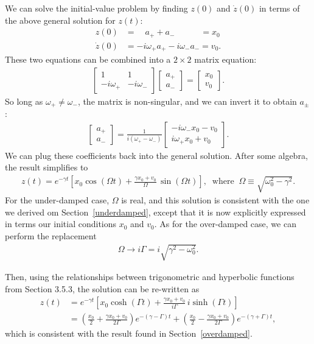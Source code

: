 \documentclass[10pt,a4paper]{article}
\begin{document}
We can solve the initial-value problem by finding $z(0)$ and
$\dot{z}(0)$ in terms of the above general solution for $z(t)$:
\begin{align}
  z(0) &= \quad a_+ + a_- \qquad\quad= x_0 \\
  \dot{z}(0) &= -i\omega_+ a_+ - i \omega_- a_- = v_0.
\end{align}
These two equations can be combined into a $2\times2$ matrix equation:
\begin{align}
  \begin{bmatrix}1 & 1 \\ -i\omega_+ & -i\omega_-\end{bmatrix} \begin{bmatrix}a_+ \\ a_-\end{bmatrix} = \begin{bmatrix}x_0 \\ v_0\end{bmatrix}.
\end{align}
So long as $\omega_+ \ne \omega_-$, the matrix is non-singular, and we
can invert it to obtain $a_\pm$:
\begin{align}
  \begin{bmatrix}a_+ \\ a_-\end{bmatrix} = \frac{1}{i(\omega_+-\omega_-)}\begin{bmatrix}-i\omega_-x_0 - v_0 \\ i\omega_+x_0 + v_0 \end{bmatrix}.
\end{align}
We can plug these coefficients back into the general solution. After
some algebra, the result simplifies to
\begin{align}
  z(t) = e^{-\gamma t} \left[x_0 \cos(\Omega t) + \frac{\gamma x_0 + v_0}{\Omega} \, \sin(\Omega t)\right], \;\; \mathrm{where}\;\; \Omega \equiv \sqrt{\omega_0^2 - \gamma^2}.
\end{align}
For the under-damped case, $\Omega$ is real, and this solution is
consistent with the one we derived om Section~\ref{underdamped},
except that it is now explicitly expressed in terms our initial
conditions $x_0$ and $v_0$. As for the over-damped case, we can
perform the replacement
\begin{align}
  \Omega \rightarrow i \Gamma = i \sqrt{\gamma^2 - \omega_0^2}.
\end{align}

Then, using the relationships between trigonometric and hyperbolic
functions from Section 3.5.3, the solution can be re-written as
\begin{align}
  z(t) &= e^{-\gamma t} \left[x_0 \cosh(\Gamma t) + \frac{\gamma x_0 + v_0}{i\Gamma} \, i \sinh(\Gamma t)\right] \\
  &= \left(\frac{x_0}{2} + \frac{\gamma x_0 + v_0}{2\Gamma}\right) e^{-(\gamma - \Gamma) t} + \left(\frac{x_0}{2} - \frac{\gamma x_0 + v_0}{2\Gamma}\right) e^{-(\gamma+\Gamma)t},
\end{align}
which is consistent with the result found in Section~\ref{overdamped}.
\end{document}
